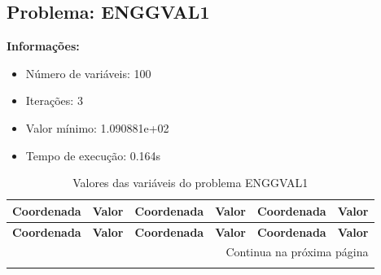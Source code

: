 \documentclass[12pt]{article}
\begin{document}
\newpage            
\subsection{Problema: ENGGVAL1}

\textbf{Informações:}
\begin{itemize}
\item Número de variáveis: 100
\item Iterações: 3
\item Valor mínimo: 1.090881e+02
\item Tempo de execução: 0.164s
\end{itemize}

\small
\begin{longtable}{@{}cc|cc|cc@{}}
\caption{Valores das variáveis do problema ENGGVAL1} \\
\toprule
\textbf{Coordenada} & \textbf{Valor} & \textbf{Coordenada} & \textbf{Valor} & \textbf{Coordenada} & \textbf{Valor} \\
\midrule
\endfirsthead

\toprule
\textbf{Coordenada} & \textbf{Valor} & \textbf{Coordenada} & \textbf{Valor} & \textbf{Coordenada} & \textbf{Valor} \\
\midrule
\endhead

\midrule \multicolumn{6}{r}{{Continua na próxima página}} \\ \midrule
\endfoot


\end{longtable}
\end{document}
